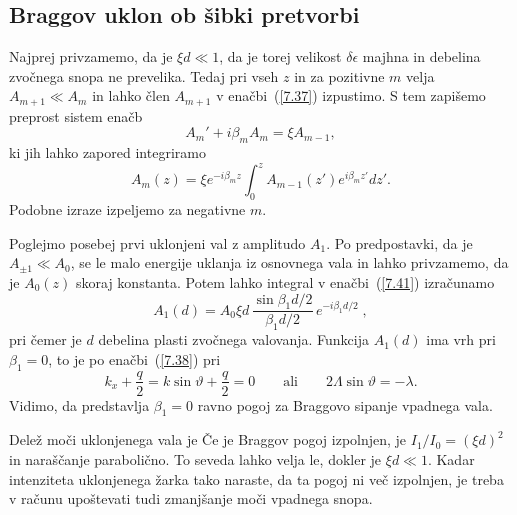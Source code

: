 \subsection*{Braggov uklon ob šibki pretvorbi}
Najprej privzamemo, da je $\xi d\ll 1$, da je torej velikost $\delta \epsilon$
majhna in debelina zvočnega snopa ne prevelika. Tedaj pri vseh
$z$ in za pozitivne $m$ velja $A_{m+1}\ll A_{m}$ in lahko člen $A_{m+1}$
v enačbi~(\ref{7.37}) izpustimo. S tem zapišemo preprost sistem enačb
\begin{equation}
A_{m}'+i\beta_{m}A_{m}=\xi A_{m-1},
\label{7.40}
\end{equation}
 ki jih lahko zapored integriramo
\begin{equation}
A_{m}(z)=\xi e^{-i\beta_{m}z}\int_{0}^{z}A_{m-1}(z')
e^{i\beta_{m}z'}dz'.
\label{7.41}
\end{equation}
Podobne izraze izpeljemo za negativne $m$.

Poglejmo posebej prvi uklonjeni val z amplitudo $A_{1}$. Po predpostavki,
da je $A_{\pm1}\ll A_{0}$, se le malo energije uklanja iz osnovnega
vala in lahko privzamemo, da je $A_{0}(z)$ skoraj konstanta. 
Potem lahko integral v enačbi~(\ref{7.41})
izračunamo
\begin{equation}
A_{1}(d)=A_{0}\xi d\,\frac{\sin\beta_{1}d/2}{\beta_{1}d/2}\, e^{-i\beta_{1}d/2}\;,
\label{7.41a}
\end{equation}
pri čemer je $d$ debelina plasti zvočnega valovanja.
Funkcija $A_{1}(d)$ ima vrh pri $\beta_{1}=0$, to je po enačbi~(\ref{7.38}) pri 
\begin{equation}
k_x+ \frac{q}{2} = k \sin\vartheta + \frac{q}{2} = 0
\qquad \mathrm{ali} \qquad 
2\Lambda\sin\vartheta=-\lambda.
\label{7.43}
\end{equation}
Vidimo, da predstavlja $\beta_{1}=0$ ravno pogoj za Braggovo sipanje vpadnega
vala.

Delež moči uklonjenega vala je 
Če je Braggov pogoj izpolnjen, je $I_{1}/I_{0}=(\xi d)^{2}$ in naraščanje parabolično. To seveda
lahko velja le, dokler je $\xi d\ll1$. Kadar intenziteta uklonjenega žarka
tako naraste, da ta pogoj ni več izpolnjen, je treba v računu upoštevati tudi 
zmanjšanje moči vpadnega snopa.

